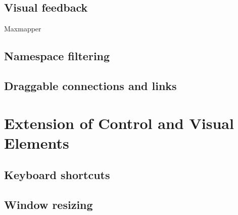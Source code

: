 
	\subsection{Visual feedback} %
	\label{sub:visual_feedback}

Maxmapper 


	\subsection{Namespace filtering} %
	\label{sub:namespace_filtering}

	\subsection{Draggable connections and links} %
	\label{sub:draggable_connections_and_links}
	


\section{Extension of Control and Visual Elements} %
\label{sec:extension_of_control_and_visual_elements}

	\subsection{Keyboard shortcuts} %
	\label{sec:keyboard_shortcuts}

	

	\subsection{Window resizing} %
	\label{sec:window_resizing}
	
